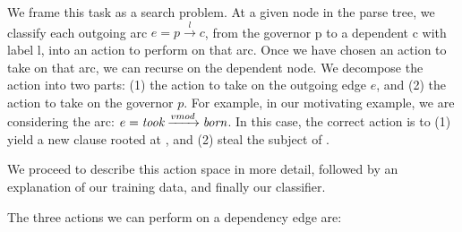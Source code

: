 
We frame this task as a search problem.
At a given node in the parse tree, we classify each outgoing arc
  $e = p \xrightarrow{l} c$, from the governor p to a dependent c with label l,
  into an action to perform on that arc.
Once we have chosen an action to take on that arc, we can recurse on the
  dependent node.
We decompose the action into two parts: (1) the action to take on the outgoing
  edge $e$, and (2) the action to take on the
  governor $p$.
For example, in our motivating example, we are considering the arc:
  $e = \textit{took} \xrightarrow{vmod} \textit{born}$.
In this case, the correct action is to
  (1) yield a new clause rooted at ,
  and (2) steal the subject of . 



We proceed to describe this action space in more detail, followed by an
  explanation of our training data, and finally our classifier.

%
%
The three actions we can perform on a dependency edge are:

